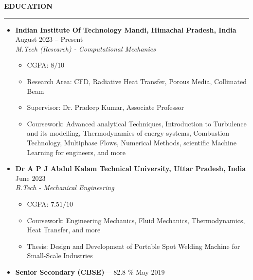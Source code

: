 \documentclass[letterpaper,10pt]{article}
\newcommand{\sectionline}[1]{%
    \vspace{0.7em}%
    \textbf{\large #1} \vspace{-2.0em}\\%
    
    \rule{\textwidth}{0.5pt}%
    \vspace{0.25em}%
}
\begin{document}
\sectionline{EDUCATION}
\begin{itemize}
    \item \textbf{Indian Institute Of Technology Mandi, Himachal Pradesh, India} \hfill August 2023 -- Present\\
    \textit{M.Tech (Research) - Computational Mechanics}
    \begin{itemize}[nosep]
        \item CGPA: $8/10$
        \item Research Area: CFD, Radiative Heat Transfer, Porous Media, Collimated Beam
        \item Supervisor: Dr. Pradeep Kumar, Associate Professor
        \item Coursework: Advanced analytical Techniques, Introduction to Turbulence and its modelling, Thermodynamics of energy systems, Combustion Technology, Multiphase Flows, Numerical Methods, scientific Machine Learning for engineers, and more
    \end{itemize}
    \vspace{0.5em}
    \item \textbf{Dr A P J Abdul Kalam Technical University, Uttar Pradesh, India} \hfill  June 2023\\
    \textit{B.Tech - Mechanical Engineering}
    \begin{itemize}[nosep]
        \item CGPA: $7.51/10$
        \item Coursework: Engineering Mechanics, Fluid Mechanics, Thermodynamics, Heat Transfer, and more
        \item Thesis: Design and Development of Portable Spot Welding Machine for Small-Scale Industries
    \end{itemize}
    \vspace{0.5em}
    \item \textbf{Senior Secondary (CBSE)}— 82.8 \%  \hfill  May 2019

\end{itemize}
\end{document}
